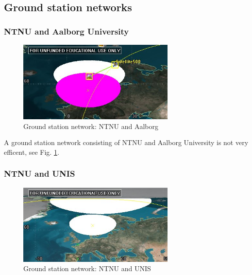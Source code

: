 \subsection{Ground station networks}

\subsubsection{NTNU and Aalborg University}

\begin{figure}
  \begin{center}
    \includegraphics[width=0.7\textwidth]{Figures/range_ntnu_aalborg}
  \end{center}
  \caption[NTNU Aalborg]{Ground station network: NTNU and Aalborg}
  \label{fig:range_ntnu_aalborg}
\end{figure}

A ground station network consisting of NTNU and Aalborg University is not very efficent, see Fig. \ref{fig:range_ntnu_aalborg}.

\subsubsection{NTNU and UNIS}
 
\begin{figure}
  \begin{center}
    \includegraphics[width=0.7\textwidth]{Figures/range_ntnu_svalbard}
  \end{center}
  \caption[NTNU Aalborg]{Ground station network: NTNU and UNIS}
  \label{fig:range_ntnu_unis}
\end{figure}